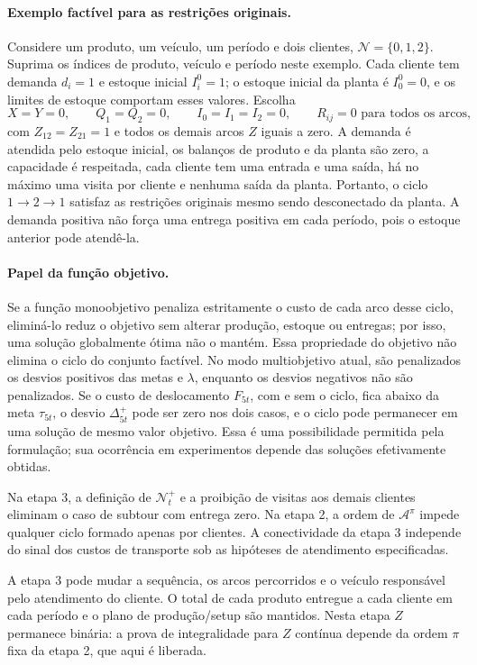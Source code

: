 \documentclass[11pt,a4paper]{article}
\newcommand{\N}{\mathcal{N}}
\newcommand{\A}{\mathcal{A}}
\begin{document}
\paragraph{Exemplo factível para as restrições originais.} Considere um produto, um veículo, um período e dois clientes, $\N=\{0,1,2\}$. Suprima os índices de produto, veículo e período neste exemplo. Cada cliente tem demanda $d_i=1$ e estoque inicial $I^0_i=1$; o estoque inicial da planta é $I^0_0=0$, e os limites de estoque comportam esses valores. Escolha
\[
 X=Y=0,\qquad Q_1=Q_2=0,\qquad I_0=I_1=I_2=0,
 \qquad R_{ij}=0\text{ para todos os arcos},
\]
com $Z_{12}=Z_{21}=1$ e todos os demais arcos $Z$ iguais a zero. A demanda é atendida pelo estoque inicial, os balanços de produto e da planta são zero, a capacidade é respeitada, cada cliente tem uma entrada e uma saída, há no máximo uma visita por cliente e nenhuma saída da planta. Portanto, o ciclo $1\to2\to1$ satisfaz as restrições originais mesmo sendo desconectado da planta. A demanda positiva não força uma entrega positiva em cada período, pois o estoque anterior pode atendê-la.

\paragraph{Papel da função objetivo.} Se a função monoobjetivo penaliza estritamente o custo de cada arco desse ciclo, eliminá-lo reduz o objetivo sem alterar produção, estoque ou entregas; por isso, uma solução globalmente ótima não o mantém. Essa propriedade do objetivo não elimina o ciclo do conjunto factível. No modo multiobjetivo atual, são penalizados os desvios positivos das metas e $\lambda$, enquanto os desvios negativos não são penalizados. Se o custo de deslocamento $F_{5t}$, com e sem o ciclo, fica abaixo da meta $\tau_{5t}$, o desvio $\Delta^+_{5t}$ pode ser zero nos dois casos, e o ciclo pode permanecer em uma solução de mesmo valor objetivo. Essa é uma possibilidade permitida pela formulação; sua ocorrência em experimentos depende das soluções efetivamente obtidas.

Na etapa 3, a definição de $\N_t^+$ e a proibição de visitas aos demais clientes eliminam o caso de subtour com entrega zero. Na etapa 2, a ordem de $\A^\pi$ impede qualquer ciclo formado apenas por clientes. A conectividade da etapa 3 independe do sinal dos custos de transporte sob as hipóteses de atendimento especificadas.

A etapa 3 pode mudar a sequência, os arcos percorridos e o veículo responsável pelo atendimento do cliente. O total de cada produto entregue a cada cliente em cada período e o plano de produção/setup são mantidos. Nesta etapa $Z$ permanece binária: a prova de integralidade para $Z$ contínua depende da ordem $\pi$ fixa da etapa 2, que aqui é liberada.
\end{document}
